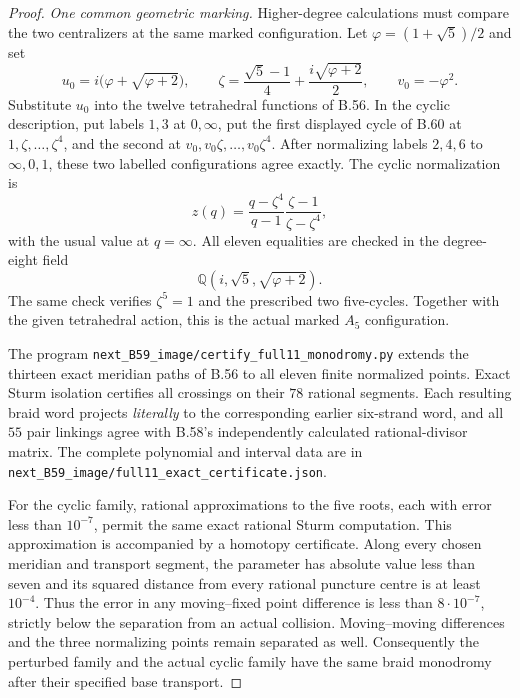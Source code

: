 \begin{proof}
\emph{One common geometric marking.}
Higher-degree calculations must compare the two centralizers
at the same marked configuration.
Let $\varphi=(1+\sqrt5)/2$ and set
\[
 u_0=i\bigl(\varphi+\sqrt{\varphi+2}\bigr),\qquad
 \zeta=\frac{\sqrt5-1}{4}+
                  \frac{i\sqrt{\varphi+2}}2,
 \qquad v_0=-\varphi^2.                                    \tag{B.61.2}
\]
Substitute $u_0$ into the twelve tetrahedral functions of
B.56.  In the cyclic description, put labels $1,3$ at
$0,\infty$, put the first displayed cycle of B.60 at
$1,\zeta,\ldots,\zeta^4$, and the second at
$v_0,v_0\zeta,\ldots,v_0\zeta^4$.
After normalizing labels $2,4,6$ to $\infty,0,1$,
these two labelled configurations agree exactly.
The cyclic normalization is
\[
 z(q)=\frac{q-\zeta^4}{q-1}
             \frac{\zeta-1}{\zeta-\zeta^4},                \tag{B.61.3}
\]
with the usual value at $q=\infty$.
All eleven equalities are checked in the degree-eight field
\[
                  \mathbb Q(i,\sqrt5,\sqrt{\varphi+2}).
\]
The same check verifies $\zeta^5=1$ and the prescribed
two five-cycles.  Together with the given tetrahedral
action, this is the actual marked $A_5$ configuration.

The program \nolinkurl{next_B59_image/certify_full11_monodromy.py}
extends the thirteen exact meridian paths of B.56 to all
eleven finite normalized points.  Exact Sturm isolation
certifies all crossings on their $78$ rational segments.
Each resulting braid word projects \emph{literally} to
the corresponding earlier six-strand word, and all $55$
pair linkings agree with B.58's independently calculated
rational-divisor matrix.
The complete polynomial and interval data are in
\nolinkurl{next_B59_image/full11_exact_certificate.json}.

For the cyclic family, rational approximations to the five
roots, each with error less than $10^{-7}$, permit the
same exact rational Sturm computation.
This approximation is accompanied by a homotopy certificate.
Along every chosen meridian and transport segment, the
parameter has absolute value less than seven and its
squared distance from every rational puncture centre is
at least $10^{-4}$.
Thus the error in any moving--fixed point difference is
less than $8\cdot10^{-7}$, strictly below the separation
from an actual collision.  Moving--moving differences
and the three normalizing points remain separated as well.
Consequently the perturbed family and the actual cyclic
family have the same braid monodromy after their specified
base transport.


\end{proof}
